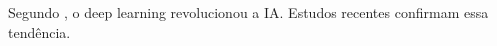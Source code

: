 
% 

Segundo \citet{Goodfellow2016}, o deep learning revolucionou a IA.
Estudos recentes \citep{Smith2023, Jones2024} confirmam essa tendência.






